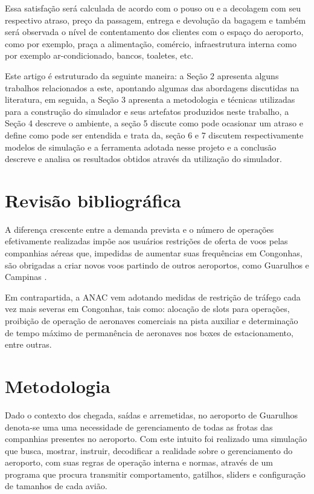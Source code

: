 \documentclass[12pt]{article}
\begin{document}
Essa satisfação será calculada de acordo com o pouso ou e a decolagem com 
seu respectivo atraso, preço da passagem, entrega e devolução da bagagem
e também será observada o nível de contentamento dos clientes com o espaço
do aeroporto, como por exemplo, praça a alimentação, comércio, 
infraestrutura interna como por exemplo ar-condicionado, bancos, toaletes,
etc.


Este artigo é estruturado da seguinte maneira: a Seção 2 apresenta alguns trabalhos
relacionados a este, apontando algumas das abordagens discutidas na literatura,
em seguida, a Seção 3 apresenta a metodologia e técnicas utilizadas para a construção 
do simulador e seus artefatos produzidos neste trabalho, a Seção 4 descreve o ambiente,
a seção 5 discute como pode ocasionar um atraso e define como pode ser entendida e trata
da, seção 6 e 7 discutem respectivamente modelos de simulação e a ferramenta adotada
nesse projeto e a conclusão descreve e analisa os resultados obtidos através da 
utilização do simulador.
  

\section{Revisão bibliográfica} \label{sec:revisaobibliografica}

A diferença crescente entre a demanda prevista e o número de
operações efetivamente realizadas impõe aos usuários
restrições de oferta de voos pelas companhias aéreas que,
impedidas de aumentar suas frequências em Congonhas, são 
obrigadas a criar novos voos partindo de outros aeroportos,
como Guarulhos e Campinas \cite{boulic:91}.

Em contrapartida, a ANAC vem adotando medidas de restrição 
de tráfego cada vez mais severas em Congonhas, tais como: 
alocação de slots para operações, proibição de operação de 
aeronaves comerciais na pista auxiliar e determinação de tempo
máximo de permanência de aeronaves nos boxes de estacionamento,
entre outras\cite{Medau:09}. 


\section{Metodologia}



Dado o contexto dos chegada, saídas e arremetidas, no aeroporto de Guarulhos denota-se uma
uma necessidade de gerenciamento de todas as frotas das companhias presentes no aeroporto.
Com este intuito foi realizado uma simulação que busca, mostrar, instruir, decodificar a
realidade sobre o gerenciamento do aeroporto, com suas regras de operação interna e normas, 
através de um programa que procura transmitir comportamento, gatilhos, sliders e configuração
de tamanhos de cada avião.
\end{document}
